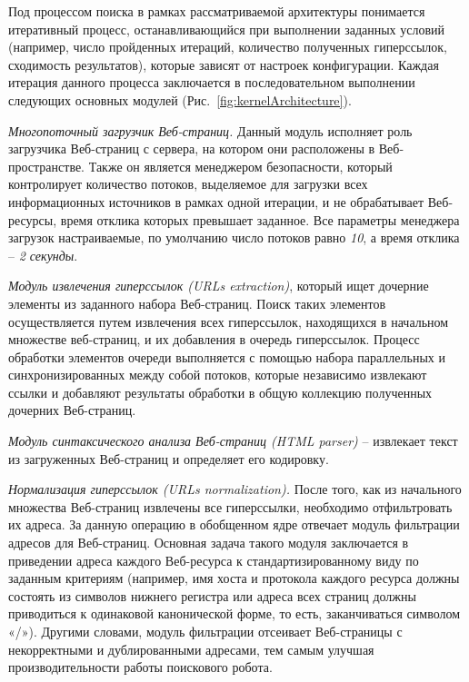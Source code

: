Под процессом поиска в рамках рассматриваемой архитектуры понимается итеративный процесс, останавливающийся при выполнении заданных условий (например, число пройденных итераций, количество полученных гиперссылок, сходимость результатов), которые зависят от настроек конфигурации. Каждая итерация данного процесса заключается в последовательном выполнении следующих основных модулей (Рис.~\cref{fig:kernelArchitecture}).

\textit{Многопоточный загрузчик Веб-страниц.} Данный модуль исполняет роль загрузчика Веб-страниц с сервера, на котором они расположены в Веб-пространстве. Также он является менеджером безопасности, который контролирует количество потоков, выделяемое для загрузки всех информационных источников в рамках одной итерации, и не обрабатывает Веб-ресурсы, время отклика которых превышает заданное. Все параметры менеджера загрузок настраиваемые, по умолчанию число потоков равно \textit{10}, а время отклика -- \textit{2 секунды}.

\textit{Модуль извлечения гиперссылок (URLs extraction)}, который ищет дочерние элементы из заданного набора Веб-страниц. Поиск таких элементов осуществляется путем извлечения всех гиперссылок, находящихся в начальном множестве веб-страниц, и их добавления в очередь гиперссылок. Процесс обработки элементов очереди выполняется с помощью набора параллельных и синхронизированных между собой потоков, которые независимо извлекают ссылки и добавляют результаты обработки в общую коллекцию полученных дочерних Веб-страниц.

\textit{Модуль синтаксического анализа Веб-страниц (HTML parser)} -- извлекает текст из загруженных Веб-страниц и определяет его кодировку.

\textit{Нормализация гиперссылок (URLs normalization).} После того, как из начального множества Веб-страниц извлечены все гиперссылки, необходимо отфильтровать их адреса. За данную операцию в обобщенном ядре отвечает модуль фильтрации адресов для Веб-страниц. Основная задача такого модуля заключается в приведении адреса каждого Веб-ресурса к стандартизированному виду по заданным критериям \cite{LeeKimHong} (например, имя хоста и протокола каждого ресурса должны состоять из символов нижнего регистра или адреса всех страниц должны приводиться к одинаковой канонической форме, то есть, заканчиваться символом «/»). Другими словами, модуль фильтрации отсеивает Веб-страницы с некорректными и дублированными адресами, тем самым улучшая производительности работы поискового робота.

